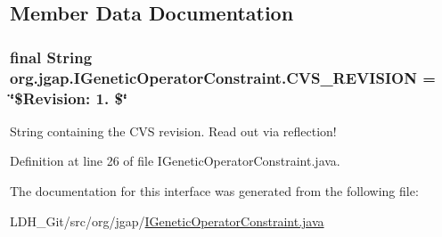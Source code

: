 \subsection{Member Data Documentation}
\hypertarget{interfaceorg_1_1jgap_1_1_i_genetic_operator_constraint_a416f31433b541f0c56740872334e0d3b}{
\subsubsection[{C\-V\-S\-\_\-\-R\-E\-V\-I\-S\-I\-O\-N}]{\setlength{\rightskip}{0pt plus 5cm}final String org.\-jgap.\-I\-Genetic\-Operator\-Constraint.\-C\-V\-S\-\_\-\-R\-E\-V\-I\-S\-I\-O\-N = \char`\"{}\$Revision\-: 1. \$\char`\"{}\hspace{0.3cm}{\ttfamily [static]}}}\label{interfaceorg_1_1jgap_1_1_i_genetic_operator_constraint_a416f31433b541f0c56740872334e0d3b}
String containing the C\-V\-S revision. Read out via reflection! 

Definition at line 26 of file I\-Genetic\-Operator\-Constraint.\-java.



The documentation for this interface was generated from the following file\-:\begin{DoxyCompactItemize}
\item 
L\-D\-H\-\_\-\-Git/src/org/jgap/\hyperlink{_i_genetic_operator_constraint_8java}{I\-Genetic\-Operator\-Constraint.\-java}\end{DoxyCompactItemize}
